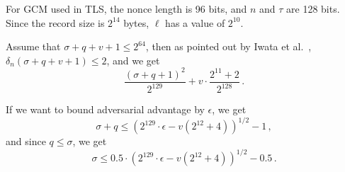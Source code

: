 \documentclass{article}
\begin{document}
For GCM used in TLS, the nonce length is 96 bits, and $n$ and $\tau$ are 128 bits. Since the record size is $2^{14}$ bytes, $\ell$ has a value of $2^{10}$.

Assume that $\sigma+q+v+1\le 2^{64}$, then as pointed out by Iwata et al.\ , $\delta_n(\sigma+q+v+1) \le 2$, and we get
\begin{equation}
  \frac{(\sigma+q+1)^2}{2^{129}} + v\cdot\frac{2^{11}+2}{2^{128}}\,.
\end{equation}

If we want to bound adversarial advantage by $\epsilon$, we get
\begin{equation}
  \sigma+q\le \left(2^{129}\cdot\epsilon - v(2^{12}+4)\right)^{1/2}-1\,,
\end{equation}
and since $q\le\sigma$, we get
\begin{equation}\label{sigmabound}
  \sigma\le 0.5\cdot\left(2^{129}\cdot\epsilon - v(2^{12}+4)\right)^{1/2}-0.5\,.
\end{equation}



\end{document}
